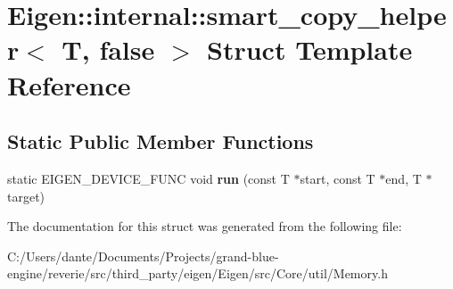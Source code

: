 \hypertarget{struct_eigen_1_1internal_1_1smart__copy__helper_3_01_t_00_01false_01_4}{}\section{Eigen\+::internal\+::smart\+\_\+copy\+\_\+helper$<$ T, false $>$ Struct Template Reference}
\label{struct_eigen_1_1internal_1_1smart__copy__helper_3_01_t_00_01false_01_4}
\subsection*{Static Public Member Functions}
\begin{DoxyCompactItemize}
\item 
\mbox{\label{struct_eigen_1_1internal_1_1smart__copy__helper_3_01_t_00_01false_01_4_a3402ad1bfee4744ffc250e1c05deb149}} 
static E\+I\+G\+E\+N\+\_\+\+D\+E\+V\+I\+C\+E\+\_\+\+F\+U\+NC void {\bfseries run} (const T $\ast$start, const T $\ast$end, T $\ast$target)
\end{DoxyCompactItemize}


The documentation for this struct was generated from the following file\+:\begin{DoxyCompactItemize}
\item 
C\+:/\+Users/dante/\+Documents/\+Projects/grand-\/blue-\/engine/reverie/src/third\+\_\+party/eigen/\+Eigen/src/\+Core/util/Memory.\+h\end{DoxyCompactItemize}
